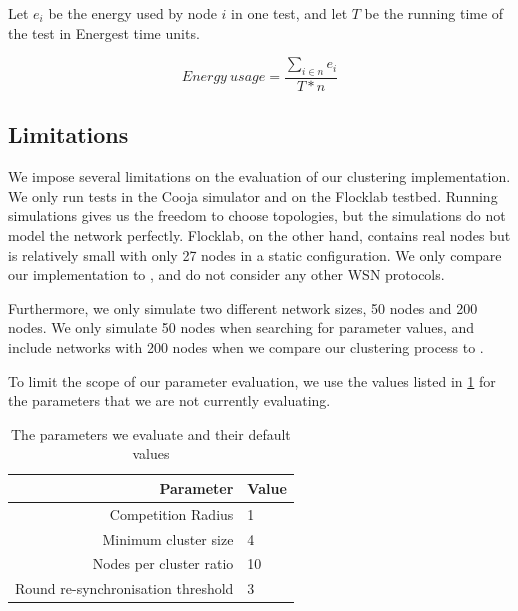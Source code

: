 \begin{newtext}
\begin{Definitions}{}{}
Let $e_{i}$ be the energy used by node $i$ in one test, and let $T$ be the running time of the test in Energest time units.

\begin{equation*}
    Energy\ usage = \frac{\sum\limits_{i \in n}{e_{i}}}{T*n}
\end{equation*}
\end{Definitions}

\end{newtext}

\subsection{Limitations}
We impose several limitations on the evaluation of our clustering implementation. We only run tests in the Cooja simulator and on the Flocklab testbed. Running simulations gives us the freedom to choose topologies, but the simulations do not model the network perfectly. Flocklab, on the other hand, contains real nodes but is relatively small with only 27 nodes in a static configuration. We only compare our implementation to \atwo{}, and do not consider any other WSN protocols.

Furthermore, we only simulate two different network sizes, 50 nodes and 200 nodes. We only simulate 50 nodes when searching for parameter values, and include networks with 200 nodes when we compare our clustering process to \atwo{}.

To limit the scope of our parameter evaluation, we use the values listed in \cref{tab:parameter-default-values} for the parameters that we are not currently evaluating.

\begin{table}[bt]
\centering
\caption{The parameters we evaluate and their default values}
\label{tab:parameter-default-values}
\begin{tabular}{r|l}
\textbf{Parameter}                 & \textbf{Value} \\ \hline
Competition Radius                 & 1              \\
Minimum cluster size                 & 4              \\
Nodes per cluster ratio            & 10             \\
Round re-synchronisation threshold & 3             
\end{tabular}
\end{table}


